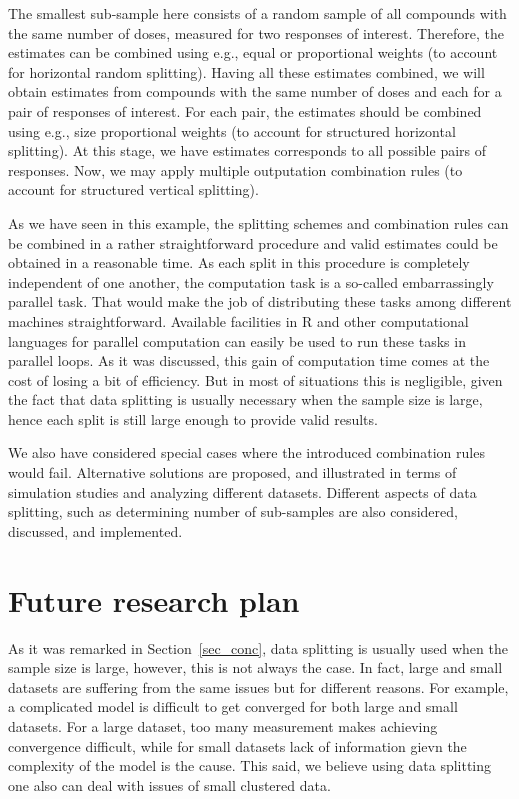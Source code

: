 \documentclass[11pt,a5paper,twoside]{book}
\begin{document}
The smallest sub-sample here consists of a random sample of all compounds with the same number of doses, measured for two responses of interest. Therefore, the estimates can be combined using e.g., equal or proportional weights (to account for horizontal random splitting). Having all these estimates combined, we will obtain estimates from compounds with the same number of doses and each for a pair of responses of interest. For each pair, the estimates should be combined using e.g., size proportional weights (to account for structured horizontal splitting). At this stage, we have estimates corresponds to all possible pairs of responses. Now, we may apply multiple outputation combination rules (to account for structured vertical splitting).

As we have seen in this example, the splitting schemes and combination rules can be combined in a rather straightforward procedure and valid estimates could be obtained in a reasonable time. As each split in this procedure is completely independent of one another, the computation task is a so-called embarrassingly parallel task. That would make the job of distributing these tasks among different machines straightforward. Available facilities in R and other computational languages for parallel computation can easily be used to run these tasks in parallel loops. As it was discussed, this gain of computation time comes at the cost of losing a bit of efficiency. But in most of situations this is negligible, given the fact that data splitting is usually necessary when the sample size is large, hence each split is still large enough to provide valid results. 

We also have considered special cases where the introduced combination rules would fail. Alternative solutions are proposed, and illustrated in terms of simulation studies and analyzing different datasets. Different aspects of data splitting, such as determining number of sub-samples are also considered, discussed, and implemented. 





\section{Future research plan}
\label{sec_future}

As it was remarked in Section~\ref{sec_conc}, data splitting is usually used when the sample size is large, however, this is not always the case. In fact, large and small datasets are suffering from the same issues but for different reasons. For example, a complicated model is difficult to get converged for both large and small datasets. For a large dataset, too many measurement makes achieving convergence difficult, while for small datasets lack of information gievn the complexity of the model is the cause. This said, we believe using data splitting one also can deal with issues of small clustered data.
\end{document}
